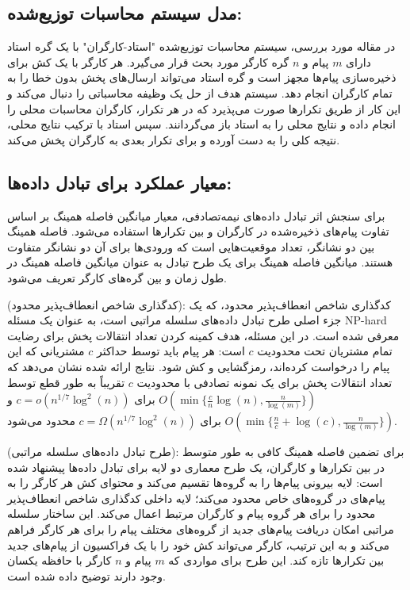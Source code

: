 \subsection*{مدل سیستم محاسبات توزیع‌شده:}
در مقاله مورد بررسی، سیستم محاسبات توزیع‌شده "استاد-کارگران" با یک گره استاد دارای \(m\) پیام و \(n\) گره کارگر مورد بحث قرار می‌گیرد. هر کارگر با یک کش برای ذخیره‌سازی پیام‌ها مجهز است و گره استاد می‌تواند ارسال‌های پخش بدون خطا را به تمام کارگران انجام دهد. سیستم هدف از حل یک وظیفه محاسباتی را دنبال می‌کند و این کار از طریق تکرارها صورت می‌پذیرد که در هر تکرار، کارگران محاسبات محلی را انجام داده و نتایج محلی را به استاد باز می‌گردانند. سپس استاد با ترکیب نتایج محلی، نتیجه کلی را به دست آورده و برای تکرار بعدی به کارگران پخش می‌کند.

\subsection*{معیار عملکرد برای تبادل داده‌ها:}
برای سنجش اثر تبادل داده‌های نیمه‌تصادفی، معیار میانگین فاصله همینگ بر اساس تفاوت پیام‌های ذخیره‌شده در کارگران و بین تکرارها استفاده می‌شود. فاصله همینگ بین دو نشانگر، تعداد موقعیت‌هایی است که ورودی‌ها برای آن دو نشانگر متفاوت هستند. میانگین فاصله همینگ برای یک طرح تبادل به عنوان میانگین فاصله همینگ در طول زمان و بین گره‌های کارگر تعریف می‌شود.

\begin{theorem}{ (کدگذاری شاخص انعطاف‌پذیر محدود):}
	کدگذاری شاخص انعطاف‌پذیر محدود، که یک جزء اصلی طرح تبادل داده‌های سلسله مراتبی است، به عنوان یک مسئله NP-hard معرفی شده است. در این مسئله، هدف کمینه کردن تعداد انتقالات پخش برای رضایت تمام مشتریان تحت محدودیت \(c\) است: هر پیام باید توسط حداکثر \(c\) مشتریانی که این پیام را درخواست کرده‌اند، رمزگشایی و کش شود. نتایج ارائه شده نشان می‌دهد که تعداد انتقالات پخش برای یک نمونه تصادفی با محدودیت \(c\) تقریباً به طور قطع توسط \(O(\min\{\frac{c}{n} \log(n), \frac{n}{\log(m)}\})\) برای \(c = o(n^{1/7} \log^2(n))\) و \(O(\min\{\frac{n}{c} + \log(c), \frac{n}{\log(m)}\})\) برای \(c = \Omega(n^{1/7} \log^2(n))\) محدود می‌شود.
\end{theorem}

\begin{theorem}{ (طرح تبادل داده‌های سلسله مراتبی):}
	برای تضمین فاصله همینگ کافی به طور متوسط در بین تکرارها و کارگران، یک طرح معماری دو لایه برای تبادل داده‌ها پیشنهاد شده است: لایه بیرونی پیام‌ها را به گروه‌ها تقسیم می‌کند و محتوای کش هر کارگر را به پیام‌های در گروه‌های خاص محدود می‌کند؛ لایه داخلی کدگذاری شاخص انعطاف‌پذیر محدود را برای هر گروه پیام و کارگران مرتبط اعمال می‌کند. این ساختار سلسله مراتبی امکان دریافت پیام‌های جدید از گروه‌های مختلف پیام را برای هر کارگر فراهم می‌کند و به این ترتیب، کارگر می‌تواند کش خود را با یک فراکسیون از پیام‌های جدید بین تکرارها تازه کند. این طرح برای مواردی که \(m\) پیام و \(n\) کارگر با حافظه یکسان وجود دارند توضیح داده شده است.
\end{theorem}
